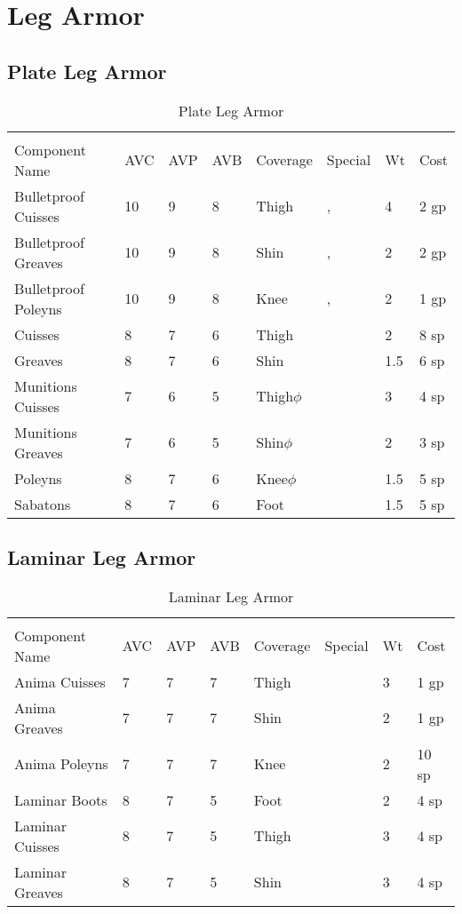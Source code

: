 \documentclass[oneside,11pt,english]{book}
\begin{document}
\section{Leg Armor}
\subsection{Plate Leg Armor}
\begin{longtabu} to 
	\captionsetup{textformat=empty, labelformat=blank}
	\caption{Plate Leg Armor} \vspace{-15pt}
	\label{tab:Plate Leg Armor}\\
Component Name&AVC&AVP&AVB& Coverage& Special& Wt&Cost\\\toprule
Bulletproof Cuisses& 10& 9& 8& Thigh& , & 4& 2 gp\\
Bulletproof Greaves& 10& 9& 8& Shin& , & 2& 2 gp\\
Bulletproof Poleyns& 10& 9& 8& Knee& , & 2& 1 gp\\
Cuisses& 8& 7& 6& Thigh& & 2& 8 sp\\
Greaves& 8& 7& 6& Shin& & 1.5& 6 sp\\
Munitions Cuisses& 7& 6& 5& Thigh\hyperref[sec:Weak Spots]{$\phi$}& & 3& 4 sp\\
Munitions Greaves& 7& 6& 5& Shin\hyperref[sec:Weak Spots]{$\phi$}& & 2& 3 sp\\
Poleyns& 8& 7& 6& Knee\hyperref[sec:Weak Spots]{$\phi$}& & 1.5& 5 sp\\
Sabatons& 8& 7& 6& Foot& & 1.5& 5 sp\\
\end{longtabu}
\subsection{Laminar Leg Armor}
\begin{longtabu} to 
	\captionsetup{textformat=empty, labelformat=blank}
	\caption{Laminar Leg Armor} \vspace{-15pt}
	\label{tab:Laminar Leg Armor}\\
Component Name&AVC&AVP&AVB& Coverage& Special& Wt&Cost\\\toprule
Anima Cuisses& 7& 7& 7& Thigh& & 3& 1 gp\\
Anima Greaves& 7& 7& 7& Shin& & 2& 1 gp\\
Anima Poleyns& 7& 7& 7& Knee& & 2& 10 sp\\
Laminar Boots& 8& 7& 5& Foot& & 2& 4 sp\\
Laminar Cuisses& 8& 7& 5& Thigh& & 3& 4 sp\\
Laminar Greaves& 8& 7& 5& Shin& & 3& 4 sp\\
\end{longtabu}
\end{document}

